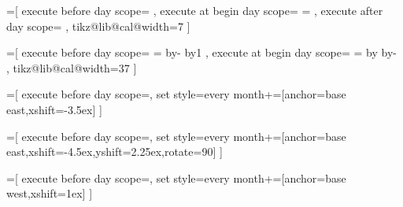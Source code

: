 %
%

=[%
  execute before day scope={%
  }, 
  execute at begin day scope={%
    \setlength\pgf@x{\tikz@lib@cal@xshift}%
    \pgf@x=\pgfcalendarcurrentweekday\pgf@x%
    \pgftransformxshift{\pgf@x}%
  },
  execute after day scope={%
  },
  tikz@lib@cal@width=7
]



%
%

=[%
  execute before day scope={%
    {%
      \edef\tikz@lib@cal@month@list@start{\pgfcalendarcurrentweekday}%
    }{}%
    {%
      {%
        \c@pgf@counta=\pgfcalendarcurrentjulian%
        \advance\c@pgf@counta by-\pgfcalendarcurrentday%
        \advance\c@pgf@counta by1\relax%
        \pgfcalendarjuliantoweekday{\c@pgf@counta}{\c@pgf@countb}%
        \xdef\pgf@temp{\the\c@pgf@countb}%
      }%
      \let\tikz@lib@cal@month@list@start=\pgf@temp%
    }{}%
  }, 
  execute at begin day scope={%
    \setlength\pgf@xa{\tikz@lib@cal@xshift}%
    \pgf@xb=\pgfcalendarcurrentday\pgf@xa%
    \advance\pgf@xb by\tikz@lib@cal@month@list@start\pgf@xa%
    \advance\pgf@xb by-\pgf@xa\relax%
    \pgftransformxshift{\pgf@xb}%
  },
  tikz@lib@cal@width=37
]




%
%

=[%
  execute before day scope={},
  set style={{every month}+=[anchor=base east,xshift=-3.5ex]}
]

=[%
  execute before day scope={},
  set style={{every month}+=[anchor=base east,xshift=-4.5ex,yshift=2.25ex,rotate=90]}
]
  
=[%
execute before day scope={},
  set style={{every month}+=[anchor=base west,xshift=1ex]}
]

